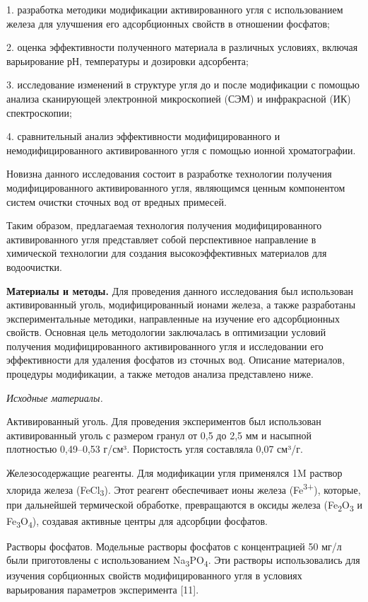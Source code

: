 \begin{multicols}{2}
1. разработка методики модификации активированного угля с использованием
железа для улучшения его адсорбционных свойств в отношении фосфатов;

2. оценка эффективности полученного материала в различных условиях,
включая варьирование рН, температуры и дозировки адсорбента;

3. исследование изменений в структуре угля до и после модификации с
помощью анализа сканирующей электронной микроскопией (СЭМ) и
инфракрасной (ИК) спектроскопии;

4. сравнительный анализ эффективности модифицированного и
немодифицированного активированного угля с помощью ионной
хроматографии.

Новизна данного исследования состоит в разработке технологии получения
модифицированного активированного угля, являющимся ценным компонентом
систем очистки сточных вод от вредных примесей.

Таким образом, предлагаемая технология получения модифицированного
активированного угля представляет собой перспективное направление в
химической технологии для создания высокоэффективных материалов для
водоочистки.

{\bfseries Материалы и методы.} Для проведения данного исследования был
использован активированный уголь, модифицированный ионами железа, а
также разработаны экспериментальные методики, направленные на изучение
его адсорбционных свойств. Основная цель методологии заключалась в
оптимизации условий получения модифицированного активированного угля и
исследовании его эффективности для удаления фосфатов из сточных вод.
Описание материалов, процедуры модификации, а также методов анализа
представлено ниже.

\emph{Исходные материалы.}

Активированный уголь. Для проведения экспериментов был использован
активированный уголь с размером гранул от 0,5 до 2,5 мм и насыпной
плотностью 0,49--0,53 г/см³. Пористость угля составляла 0,07 см³/г.

Железосодержащие реагенты. Для модификации угля применялся 1M раствор
хлорида железа (FeCl\textsubscript{3}). Этот реагент обеспечивает ионы
железа (Fe\textsuperscript{3+}), которые, при дальнейшей термической
обработке, превращаются в оксиды железа
(Fe\textsubscript{2}O\textsubscript{3} и
Fe\textsubscript{3}O\textsubscript{4}), создавая активные центры для
адсорбции фосфатов.

Растворы фосфатов. Модельные растворы фосфатов с концентрацией 50 мг/л
были приготовлены с использованием
Na\textsubscript{3}PO\textsubscript{4}. Эти растворы использовались для
изучения сорбционных свойств модифицированного угля в условиях
варьирования параметров эксперимента {[}11{]}.


\end{multicols}
